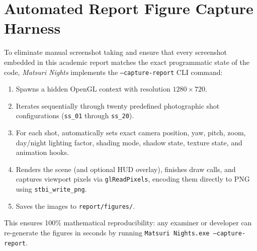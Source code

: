 \section{Automated Report Figure Capture Harness}
To eliminate manual screenshot taking and ensure that every screenshot embedded in this academic report matches the exact programmatic state of the code, \textit{Matsuri Nights} implements the \texttt{--capture-report} CLI command:
\begin{enumerate}
    \item Spawns a hidden OpenGL context with resolution $1280 \times 720$.
    \item Iterates sequentially through twenty predefined photographic shot configurations (\texttt{ss\_01} through \texttt{ss\_20}).
    \item For each shot, automatically sets exact camera position, yaw, pitch, zoom, day/night lighting factor, shading mode, shadow state, texture state, and animation hooks.
    \item Renders the scene (and optional HUD overlay), finishes draw calls, and captures viewport pixels via \texttt{glReadPixels}, encoding them directly to PNG using \texttt{stbi\_write\_png}.
    \item Saves the images to \texttt{report/figures/}.
\end{enumerate}
This ensures 100\% mathematical reproducibility: any examiner or developer can re-generate the figures in seconds by running \texttt{Matsuri Nights.exe --capture-report}.
